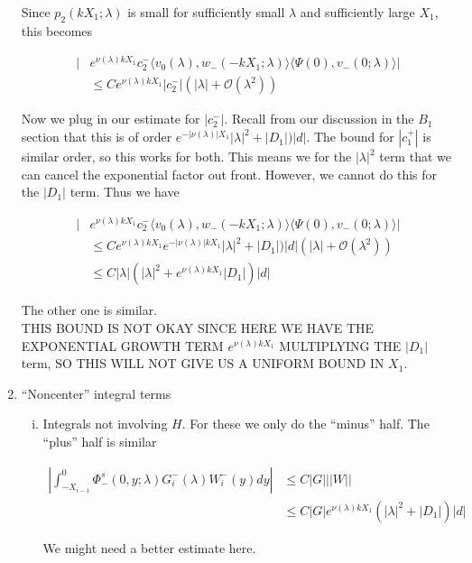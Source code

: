 \documentclass[12pt]{article}
\begin{document}
\begin{enumerate}
Since $p_2(k X_1; \lambda)$ is small for sufficiently small $\lambda$ and sufficiently large $X_1$, this becomes

\begin{align*}
|&e^{\nu(\lambda)k X_1} c_2^- \langle v_0(\lambda), w_-(-k X_1; \lambda) \rangle \langle \Psi(0), v_-(0; \lambda) \rangle| \\
&\leq C e^{\nu(\lambda)k X_1}|c_2^-| (|\lambda| + \mathcal{O}(\lambda^2) )
\end{align*}

Now we plug in our estimate for $|c_2^-|$. Recall from our discussion in the $B_1$ section that this is of order $e^{-|\nu(\lambda)|X_1} |\lambda|^2 + |D_1|) |d|$. The bound for $|c_1^+|$ is similar order, so this works for both. This means we for the $|\lambda|^2$ term that we can cancel the exponential factor out front. However, we cannot do this for the $|D_1|$ term. Thus we have

\begin{align*}
|&e^{\nu(\lambda)k X_1} c_2^- \langle v_0(\lambda), w_-(-k X_1; \lambda) \rangle \langle \Psi(0), v_-(0; \lambda) \rangle| \\
&\leq C e^{\nu(\lambda)k X_1} e^{-|\nu(\lambda)|k X_1} |\lambda|^2 + |D_1|) |d| (|\lambda| + \mathcal{O}(\lambda^2) ) \\
&\leq C |\lambda| (|\lambda|^2 + e^{\nu(\lambda)k X_1} |D_1|)|d|
\end{align*}

The other one is similar.\\

THIS BOUND IS NOT OKAY SINCE HERE WE HAVE THE EXPONENTIAL GROWTH TERM $e^{\nu(\lambda)k X_1}$ MULTIPLYING THE $|D_1|$ term, SO THIS WILL NOT GIVE US A UNIFORM BOUND IN $X_1$.

\item ``Noncenter'' integral terms

\begin{enumerate}[(i)]

\item Integrals not involving $H$. For these we only do the ``minus'' half. The ``plus'' half is similar

\begin{align*}
\left| \int_{-X_{i-1}}^0 \Phi^s_-(0, y; \lambda) G_i^-(\lambda)W_i^-(y) dy \right| 
&\leq C |G| ||W|| \\
&\leq C |G| e^{\nu(\lambda)k X_1} ( |\lambda|^2 + |D_1| )|d|
\end{align*}

We might need a better estimate here.


\end{enumerate}
\end{enumerate}
\end{document}
